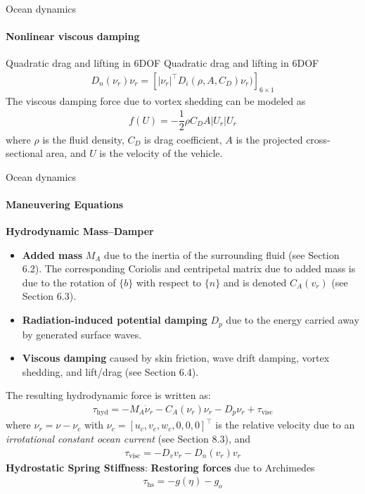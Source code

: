 




\begin{frame}{Ocean dynamics}
	\framesubtitle{Nonlinear viscous damping}
	\begin{block}{Quadratic drag and lifting in 6DOF}
		Quadratic drag and lifting in 6DOF
		\begin{align}
			D_n(\nu_r)\nu_r = [|\nu_r|^\top D_i(\rho, A, C_D)\nu_r)]_{6\times1}
		\end{align}
		The viscous damping force due to vortex shedding can be modeled as
		\begin{align}
			f(U) = -\dfrac{1}{2}\rho C_D A |U_r|U_r
		\end{align}
		where $\rho$ is the fluid density, $C_D$ is drag coefficient, $A$ is the projected cross-sectional area, and $U$ is the velocity of the vehicle.
	\end{block}
\end{frame}







\begin{frame}{Ocean dynamics}
	\framesubtitle{Maneuvering Equations}
	
	\textbf{{Hydrodynamic Mass--Damper}}
	
	\begin{itemize}
		\item \textbf{Added mass} $M_A$ due to the inertia of the surrounding fluid (see Section 6.2). The corresponding Coriolis and centripetal matrix due to added mass is due to the rotation of $\{b\}$ with respect to $\{n\}$ and is denoted $C_A({v}_r)$ (see Section 6.3).
		\item \textbf{Radiation-induced potential damping} $D_p$ due to the energy carried away by generated surface waves.
		\item \textbf{Viscous damping} caused by skin friction, wave drift damping, vortex shedding, and lift/drag (see Section 6.4). 
	\end{itemize}
	The resulting hydrodynamic force is written as:
	\begin{align}
		{\tau}_\text{hyd} = -M_A \dot{\nu}_r - C_A(\nu_r) \nu_r - D_p \nu_r + {\tau}_\text{visc}
	\end{align}
	where $\nu_r = \nu - \nu_c$ with $\nu_c = [u_c, v_c, w_c, 0, 0, 0]^\top$ is the relative velocity due to an \textit{irrotational constant ocean current} (see Section 8.3), and
	\begin{align}
		{\tau}_\text{visc} = -D_v {v}_r - D_n({v}_r) {v}_r
	\end{align}
	\textbf{{Hydrostatic Spring Stiffness}}: \textbf{Restoring forces} due to Archimedes
	\begin{align}
		{\tau}_\text{hs} = -g({\eta}) - {g}_o
	\end{align}
\end{frame}




